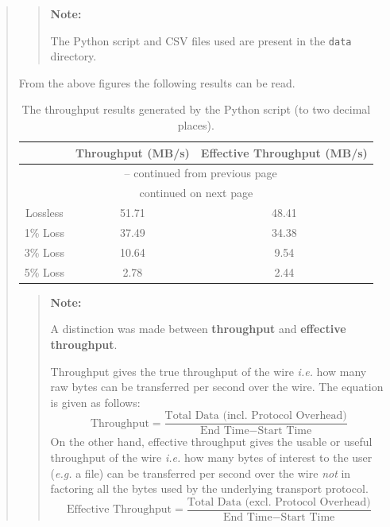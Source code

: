 \documentclass{article}
\newenvironment{ans}
   {\fbox{Answer}\begin{quote}\nopagebreak}
   {\end{quote}}
\newcommand\ie{\emph{i.e.}}
\newcommand\eg{\emph{e.g.}}
\newenvironment{note}{%
    \begin{quote}
    \begin{tcolorbox}[colback=gray!10,arc=0mm,boxrule=0pt]
    \textbf{Note:}%
}{%
	\end{tcolorbox}
    \end{quote}%
}
\begin{document}
\begin{ans}
\begin{note}
The Python script and CSV files used are present in the \texttt{data} directory.
\end{note}

From the above figures the following results can be read.

\begin{center}
\begin{longtable}{c|cc}
\caption{The throughput results generated by the Python script (to two decimal places).}
\label{longtable:results-q9}                                                                            \\
\multicolumn{1}{c|}{} &
\multicolumn{1}{c}{Throughput (MB/s)} &
\multicolumn{1}{c}{Effective Throughput (MB/s)}\\
\hline
\endfirsthead

\multicolumn{3}{c}{\tablename\ \thetable{} -- continued from previous page}                                     \\
\hline
\endhead

\hline
\multicolumn{3}{|c|}{{continued on next page}}                                                                  \\
\hline
\endfoot

\endlastfoot

Lossless & 51.71 & 48.41 \\
1\% Loss & 37.49 & 34.38 \\
3\% Loss & 10.64 & 9.54 \\
5\% Loss & 2.78 & 2.44
\end{longtable}
\end{center}

\begin{note}
A distinction was made between \textbf{throughput} and \textbf{effective
throughput}. 

Throughput gives the true throughput of the wire \ie{} how many raw bytes can be
transferred per second over the wire. The equation is given as follows:
$$
\text{Throughput} = \frac{\text{Total Data (incl. Protocol Overhead)}}{\text{End Time} - \text{Start Time}}
$$
On the other hand, effective throughput gives the usable or useful throughput of
the wire \ie{} how many bytes of interest to the user (\eg{} a file) can be
transferred per second over the wire \textit{not} in factoring all the bytes
used by the underlying transport protocol.
$$
\text{Effective Throughput} = \frac{\text{Total Data (excl. Protocol Overhead)}}{\text{End Time} - \text{Start Time}}
$$
\end{note}
\end{ans}
\end{document}
